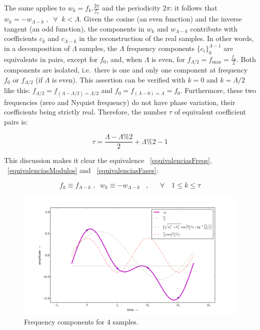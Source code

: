 The same applies to $w_k=f_k.\frac{2\pi}{f_a}$ and the periodicity $2\pi$: it follows that $w_k=-w_{\Lambda-k} \; ,\;\; \forall \;\; k<\Lambda$. Given the cosine (an even function) and the inverse tangent (an odd function), the components in $w_k$ and $w_{\Lambda-k}$ contribute with coefficients $c_k$ and $c_{\Lambda-k}$ in the reconstruction of the real samples. In other words, in a decomposition of $\Lambda$ samples, the $\Lambda$ frequency components $\{c_i\}_0^{\Lambda-1}$ are equivalents in pairs,
except for $f_0$, and, when $\Lambda$ is even, for $f_{\Lambda/2}=f_{\text{max}}=\frac{f_a}{2}$. Both components are isolated, i.e.\ there is one and only one component at frequency $f_0$ or $f_{\Lambda/2}$ (if $\Lambda$ is even). This assertion can be verified with $k=0$ and $k=\Lambda/2$ like this: $f_{\Lambda/2}=f_{(\Lambda-\Lambda/2) = \Lambda/2}$ and $f_0=f_{(\Lambda-0)=\Lambda}=f_0$.
Furthermore, these two frequencies (zero and Nyquist frequency) do not have phase variation, their coefficients being strictly real. Therefore, the number $\tau$ of equivalent coefficient pairs is:

\begin{equation}\label{coefsPareados}
\tau = \frac{\Lambda - \Lambda \% 2}{2} +\Lambda \% 2 -1
\end{equation}

This discussion makes it clear the equivalence ~\ref{equivalenciasFreqs}, ~\ref{equivalenciasModulos} and ~\ref{equivalenciasFases}:

\begin{equation}\label{equivalenciasFreqs}
f_{k}\equiv f_{\Lambda-k}\;, \;\; w_{k}\equiv-w_{\Lambda-k}\;\;\;, \quad \;\; \forall \quad 1 \leq k \leq \tau  
\end{equation}

\begin{figure}
    \centering
        \includegraphics[width=.7\textwidth]{figures/amostras4___}
    \caption{Frequency components for 4 samples.}
        \label{fig:amostras4}
\end{figure}

